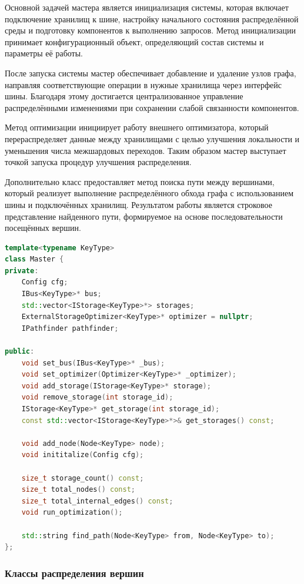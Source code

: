Основной задачей мастера является инициализация системы, которая включает подключение хранилищ к шине, настройку начального состояния распределённой среды и подготовку компонентов к выполнению запросов. Метод инициализации принимает конфигурационный объект, определяющий состав системы и параметры её работы.

После запуска системы мастер обеспечивает добавление и удаление узлов графа, направляя соответствующие операции в нужные хранилища через интерфейс шины. Благодаря этому достигается централизованное управление распределёнными изменениями при сохранении слабой связанности компонентов.

Метод оптимизации инициирует работу внешнего оптимизатора, который перераспределяет данные между хранилищами с целью улучшения локальности и уменьшения числа межшардовых переходов. Таким образом мастер выступает точкой запуска процедур улучшения распределения.

Дополнительно класс предоставляет метод поиска пути между вершинами, который реализует выполнение распределённого обхода графа с использованием шины и подключённых хранилищ. Результатом работы является строковое представление найденного пути, формируемое на основе последовательности посещённых вершин.

\begin{lstlisting}[language=C++, caption=Класс Master, label=impl-lst:master]
template<typename KeyType>
class Master {
private:
    Config cfg;
    IBus<KeyType>* bus;
    std::vector<IStorage<KeyType>*> storages;
    ExternalStorageOptimizer<KeyType>* optimizer = nullptr;
    IPathfinder pathfinder;

public:
    void set_bus(IBus<KeyType>* _bus);
    void set_optimizer(Optimizer<KeyType>* _optimizer);
    void add_storage(IStorage<KeyType>* storage);
    void remove_storage(int storage_id);
    IStorage<KeyType>* get_storage(int storage_id);
    const std::vector<IStorage<KeyType>*>& get_storages() const;

    void add_node(Node<KeyType> node);
    void inititalize(Config cfg);

    size_t storage_count() const;
    size_t total_nodes() const;
    size_t total_internal_edges() const;
    void run_optimization();

    std::string find_path(Node<KeyType> from, Node<KeyType> to);
};
\end{lstlisting}

\subsubsection{Классы распределения вершин}

